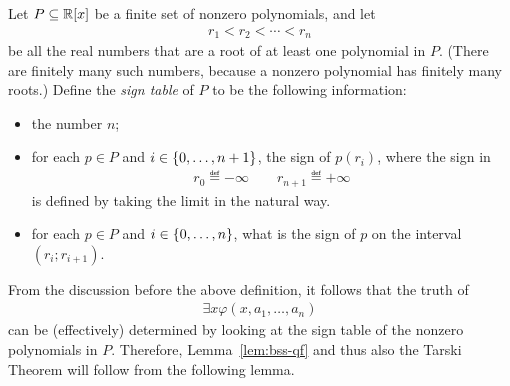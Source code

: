 \begin{definition} Let  $P \subseteq \mathbb R[x]$ be a finite set of nonzero polynomials, and let
\begin{align*}
  r_1 < r_2 < \cdots < r_n
\end{align*}
be all the real numbers that are a root of at least one polynomial in $P$. (There are finitely many such numbers, because a nonzero polynomial has finitely many roots.)  Define 
the \emph{sign table} of $P$ to be the following information:
\begin{itemize}
	\item the number $n$;
\item for each $p \in P$ and $i \in \{0,\ldots,n+1\}$, the sign of $p(r_i)$, where the sign in
\begin{align*}
  r_0 \eqdef - \infty \qquad   r_{n+1} \eqdef + \infty 
\end{align*}
 is defined by taking the limit in the natural way.
 \item for each $p \in P$ and $i \in \{0,\ldots,n\}$, what is the sign of $p$ on the interval $(r_i;r_{i+1})$.
\end{itemize}	
\end{definition}

From the discussion before the above definition, it follows that the truth of
\begin{align*}
  \exists x    \varphi(x,a_1,\ldots,a_n)
\end{align*}
can be (effectively) determined by looking at the sign table of the nonzero polynomials in $P$. Therefore, Lemma~\ref{lem:bss-qf} and thus also the Tarski Theorem will follow from the following lemma.






